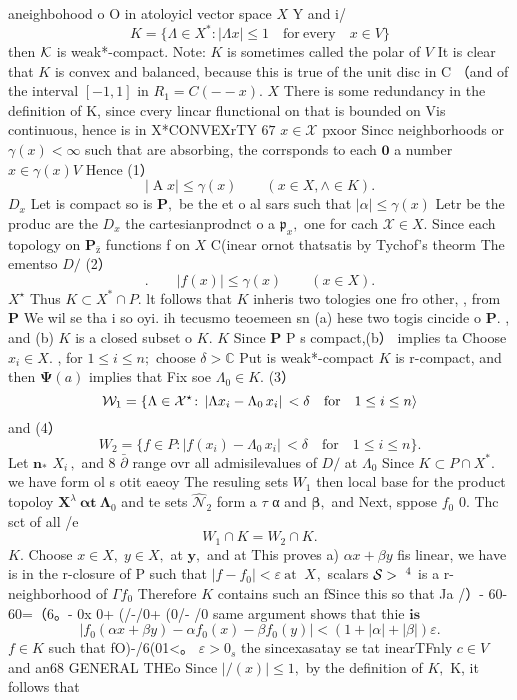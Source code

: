 aneighbohood o O in atoloyicl vector space $\textstyle X$ Y and i/ $$ K=\{\Lambda\in X^{*}\colon|\Lambda x|\leq1\quad{\mathrm{for~every}}\quad x\in V\} $$ then ${\cal K}$ is weak*-compact. Note: $\textstyle K$ is sometimes called the polar of ${\mathbf{}}V$ It is clear that $K$ is convex and balanced, because this is true of the unit disc in C （and of the interval $[-1,1]$ in $R_{1}=C(--x).$ $\textstyle X$ There is some redundancy in the definition of K, since cvery lincar flunctional on that is bounded on Vis continuous, hence is in X*CONVEXrTY $67$ $x\in{\mathcal{X}}$ pxoor Sincc neighborhoods or $\gamma(x)<\infty$ such that are absorbing, the corrsponds to each $\mathbf{0}$ a number $x\in\gamma(x)V$ Hence (1） $$ |\operatorname{A}\!x|\leq\gamma(x)\qquad(x\in X,\land\in K). $$ $D_{x}$ Let is compact so is ${\boldsymbol{P}},$ be the et o al sars such that $|\alpha|\leq\gamma(x)$ Letr be the produc are the $D_{x}$ the cartesianprodnct o a ${\mathfrak{p}}_{x},$ one for cach ${\mathcal{X}}\in X.$ Since each topology on ${\boldsymbol{P}}_{\mathrm{\bar{z}}}$ functions f on $\textstyle X$ C(inear ornot thatsatis by Tychof's theorm The ementso $D\!\!\!\!/$ (2） $$ .\qquad|f(x)|\leq\gamma(x)\qquad(x\in X). $$ $X^{\star}$ Thus $K\subset X^{*}\cap P.$ lt follows that $\textstyle K$ inheris two tologies one fro other, , from $\boldsymbol{P}$ We wil se tha i so oyi. ih tecusmo teoemeen sn (a) hese two togis cincide o ${\boldsymbol{P}}.$ , and (b) $\textstyle K$ is a closed subset o $K.$ $\textstyle K$ Since ${\boldsymbol{P}}$ P s compact,(b） implies ta Choose $x_{i}\in X.$ , for $1\leq i\leq n;$ choose $\delta>\mathbb{C}$ Put is weak*-compact $\textstyle K$ is r-compact, and then $\mathbf{\Psi}(a)$ implies that Fix soe $\Lambda_{0}\in K.$ (3） $$ \mathcal{W}_{1}=\left\{\Lambda\in{\cal X}^{\star}\!:\, |\Lambda x_{i}-\Lambda_{0}\,x_{i}\right|\,<\delta\quad\mathrm{for}\quad1\leq i\leq n\rangle $$ and (4） $$ W_{2}=\{f\in P\colon|f(x_{i})-\Lambda_{0}\,x_{i}|\,<\delta\quad\mathrm{for}\quad1\leq i\leq n\}. $$ Let ${\boldsymbol{n}}_{*}$ $X_{i}\,,$ and 8 $\bar{\partial}$ range ovr all admisilevalues of $D\!\!\!\!/$ at $\Lambda_{0}$ Since $K\subset P\cap X^{*}.$ we have form ol s otit eaeoy The resuling sets $W_{1}$ then local base for the product topoloy ${\boldsymbol{X}}^{\lambda}~{\boldsymbol{\alpha}}\mathbf{t}~{\boldsymbol{\Lambda}}_{0}$ and te sets ${\hat{\mathcal{N}}}_{2}$ form a $\tau$ α and ${\boldsymbol{\beta}},$ and Next, sppose $f_{\mathrm{0}}$ 0. Thc sct of all /e ${\mathbf{}}{\mathbf{}}\quad$ $$ W_{1}\cap K=W_{2}\cap K. $$ $K.$ Choose $x\in X,\;y\in X,$ at ${\boldsymbol{y}},$ and at This proves a) $\alpha x+\beta y$ fis linear, we have is in the r-closure of P such that $|f-f_{0}|<\varepsilon{\mathrm{~at~}}$ $X_{},$ scalars ${\cal S}>\ ^{4}$ is a r-neighborhood of $\Gamma f_{0}$ Therefore $\textstyle K$ contains such an fSince this so that Ja /）- 60- 60=（6。- 0x 0+ (/-/0+ (0/- /0 same argument shows that thie $\mathbf{i}\mathbf{s}$ $$ |f_{0}(\alpha x+\beta y)-{\alpha}f_{0}(x)-\beta f_{0}(y)|<(1+|\alpha|+|\beta|)\varepsilon. $$ $f\in K$ such that fO)-/6(01<。 $\varepsilon>0_{s}$ the sincexasatay se tat inearTFnly $c\in V$ and an68 GENERAL THEo Since $|/(x)|\leq1,$ by the definition of $K,$ K, it follows that 